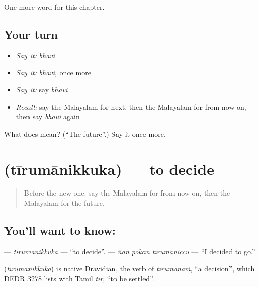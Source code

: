 \begin{grammarlens}[title={What you've built}]
One more word for this chapter.
\end{grammarlens}

\subsection*{Your turn}
\begin{itemize}
\raggedright
  \item \emph{Say it:} \emph{bhāvi}
  \item \emph{Say it:} \emph{bhāvi}, once more
  \item \emph{Say it:} say \emph{bhāvi}
  \item \emph{Recall:} say the Malayalam for next, then the Malayalam for from now on, then say \emph{bhāvi} again
\end{itemize}

\begin{tcolorbox}[breakable,colback=teal!4,colframe=teal!35!black,title={Before you move on}]
What does  mean? (\textquotedblleft{}The future\textquotedblright{}.) Say it once more.
\end{tcolorbox}
\section[\texorpdfstring{\ml{തീരുമാനിക്കുക} (tīrumānikkuka)}{തീരുമാനിക്കുക (tīrumānikkuka)}]{ (tīrumānikkuka) — to decide}

\label{lesson:ML-C179-tirumanikkuka}



\begin{quote}
Before the new one: say the Malayalam for from now on, then the Malayalam for the future.
\end{quote}

\subsection*{You'll want to know: }
\textbf{} — \emph{tīrumānikkuka} — \textquotedblleft{}to decide\textquotedblright{}. \textbf{  } — \emph{ñān pōkān tīrumāniccu} — \textquotedblleft{}I decided to go.\textquotedblright{}

\begin{cousinweb}
\textbf{} (\emph{tīrumānikkuka}) is native Dravidian, the verb of \emph{tīrumānaṁ}, \textquotedblleft{}a decision\textquotedblright{}, which DEDR 3278 lists with Tamil \emph{tīr}, \textquotedblleft{}to be settled\textquotedblright{}.
\end{cousinweb}

